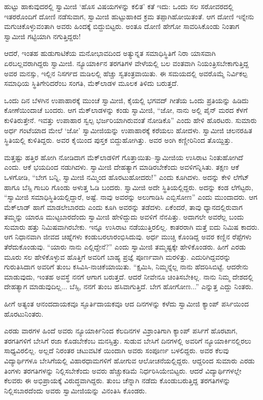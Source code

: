 ಹುಟ್ಟು ಹಾಕುವುದರಲ್ಲಿ ಸ್ವಾಮೀಜಿ ‘ಹೊಸ ವಿಷಯಗಳನ್ನು ಕಲಿತ’ ಕತೆ ಇದು: ಒಂದು ಸಲ ಸರೋವರದಲ್ಲಿ ಇತರರೊಂದಿಗೆ ದೋಣಿ ನಡೆಸುವಾಗ, ಸ್ವಾಮೀಜಿ ಹುಟ್ಟುಹಾಕಿದ ಕ್ರಮ ತಪ್ಪಾಗಿಹೋಯಿತಂತೆ. ಆಗ ದೋಣಿ ಇನ್ನೇನು ಮಗುಚಿಕೊಳ್ಳುವಂತಾಗಿ ಅವರು ಹಿಂದಕ್ಕೆ ಬಿದ್ದುಬಿಟ್ಟರು. ಅಂತೂ ದೋಣಿ ಹೇಗೋ ಸಾವರಿಸಿಕೊಂಡು ನಿಂತಾಗ ಸ್ವಾಮೀಜಿ ಗಟ್ಟಿಯಾಗಿ ನಗುತ್ತಿದ್ದರು!

ಆದರೆ, ಇಂತಹ ಹುಡುಗಾಟಿಕೆಯ ಮನೋಭಾವದಿಂದ ಅತ್ಯುನ್ನತ ಸಮಾಧಿಸ್ಥಿತಿಗೆ ನಿರಾ ಯಾಸವಾಗಿ ಏರಬಲ್ಲವರಾಗಿದ್ದರು ಸ್ವಾಮೀಜಿ. ನ್ಯೂಯಾರ್ಕಿನ ತರಗತಿಗಳ ವೇಳೆಯಲ್ಲಿ ಬಲ ವಂತವಾಗಿ ನಿಯಂತ್ರಿಸಬೇಕಾಗುತ್ತಿದ್ದ ಅವರ ಮನಸ್ಸು, ಇಲ್ಲಿನ ನಿಸರ್ಗದ ಮಡಿಲಲ್ಲಿ ಹೆಚ್ಚು ಸ್ವತಂತ್ರವಾಯಿತು. ಈ ಸಮಯದಲ್ಲಿ ಅವರೊಮ್ಮೆ ನಿರ್ವಿಕಲ್ಪ ಸಮಾಧಿಯ ಸ್ಥಿತಿಗೇರಿದರೆಂಬ ಸಂಗತಿ, ಮೆಕ್​ಲಾಡಳ ಮೂಲಕ ತಿಳಿದು ಬರುತ್ತದೆ.

ಒಂದು ದಿನ ಬೆಳಗಿನ ಉಪಾಹಾರಕ್ಕೆ ಮುಂಚೆ ಸ್ವಾಮೀಜಿ, ಕೈಯಲ್ಲಿ ಭಗವದ್ ಗೀತೆಯ ಒಂದು ಪ್ರತಿಯನ್ನು ಹಿಡಿದು ಕೋಣೆಯಿಂದಾಚೆ ಬಂದರು. ಆಗ ಮೆಕ್​ಲಾಡಳನ್ನು ಕಂಡು ಸ್ವಾಮೀಜಿ, “ಜೋ, ನಾನು ಅಲ್ಲಿ ಪೈನ್ ಮರದ ಕೆಳಗೆ ಕುಳಿತಿರುತ್ತೇನೆ. ಇವತ್ತು ಉಪಾಹಾರ ಸ್ವಲ್ಪ ಭರ್ಜರಿಯಾಗಿರುವಂತೆ ನೋಡಿಕೊ” ಎಂದು ಹೇಳಿ ಹೊರಟರು. ಸುಮಾರು ಅರ್ಧ ಗಂಟೆಯಾದ ಮೇಲೆ ‘ಜೋ’ ಸ್ವಾಮೀಜಿಯನ್ನು ಉಪಾಹಾರಕ್ಕೆ ಕರೆಯಲು ಹೋದಳು. ಸ್ವಾಮೀಜಿ ಚಲನರಹಿತ ಸ್ಥಿತಿಯಲ್ಲಿ ಕುಳಿತಿದ್ದರು. ಅವರ ಕೈಯಿಂದ ಪುಸ್ತಕ ಬಿದ್ದುಹೋಗಿತ್ತು. ಅವರ ಅಂಗಿ ಕಣ್ಣೀರಿನಿಂದ ತೊಯ್ದಿತ್ತು.

ಮತ್ತಷ್ಟು ಹತ್ತಿರ ಹೋಗಿ ನೋಡಿದಾಗ ಮೆಕ್​ಲಾಡಳಿಗೆ ಗೊತ್ತಾಯಿತು–ಸ್ವಾಮೀಜಿಯ ಉಸಿರಾಟ ನಿಂತುಹೋಗಿದೆ ಎಂದು. ಆಕೆ ಭಯದಿಂದ ನಡುಗಿದಳು. ಸ್ವಾಮೀಜಿ ದೇಹತ್ಯಾಗ ಮಾಡಿರಬೇಕೆಂದು ಅವಳಿಗನ್ನಿಸಿತು. ತಕ್ಷಣ ಆಕೆ ಒಳಗೋಡಿ, “ಬೇಗ ಬನ್ನಿ, ಸ್ವಾಮೀಜಿ ನಮ್ಮಿಂದ ಹೊರಟುಹೋದರು!” ಎಂದು ಕೂಗಿದಳು. ಅದನ್ನು ಕೇಳಿ ಲೆಗೆಟ್ ಹಾಗೂ ಬೆಸ್ಸಿ ಗಾಬರಿ ಗೊಂಡು ಅಳುತ್ತ ಓಡಿ ಬಂದರು. ಸ್ವಾಮೀಜಿ ಅದೇ ಸ್ಥಿತಿಯಲ್ಲಿದ್ದರು. ಅದನ್ನು ಕಂಡ ಲೆಗೆಟ್ಟರು, “ಸ್ವಾಮೀಜಿ ಸಮಾಧಿಸ್ಥಿತಿಯಲ್ಲಿದ್ದಾರೆ, ಅಷ್ಟೆ. ನಾವು ಅವರನ್ನು ಅಲುಗಾಡಿಸಿ ಎಬ್ಬಿಸೋಣ” ಎಂದು ಮುಂದಾದರು. ಆಗ ಮೆಕ್​ಲಾಡ್ ಹಾಗೆ ಮಾಡಲೇಬಾರದು ಎಂದು ಕೂಗಿ ಅವರನ್ನು ತಡೆದಳು. ಏಕೆಂದರೆ, ತಾವು ಧ್ಯಾನದಲ್ಲಿರುವಾಗ ತಮ್ಮನ್ನು ಯಾರೂ ಮುಟ್ಟಬಾರದೆಂದು ಸ್ವಾಮೀಜಿ ಹೇಳಿದ್ದುದು ಅವಳಿಗೆ ನೆನಪಿತ್ತು. ಅದಾಗಲೇ ಅವರೆಲ್ಲ ಬಂದು ಸುಮಾರು ಹತ್ತು ನಿಮಿಷವಾಗಿರಬೇಕು. ಇನ್ನೂ ಉಸಿರಾಟ ನಡೆಯುತ್ತಿರಲಿಲ್ಲ. ಕಾತರರಾಗಿ ಮತ್ತೆ ಐದು ನಿಮಿಷ ಕಾದರು. ಆಗ ನಿಧಾನವಾಗಿ ಜೀವದ ಚಿಹ್ನೆಗಳು ಕಂಡುಬರಲಾರಂಭಿಸಿದುವು. ಅರ್ಧ ಮುಚ್ಚಿ ಕೊಂಡಿದ್ದ ಅವರ ಕಣ್ಣಿನ ರೆಪ್ಪೆಗಳು ತೆರೆದುಕೊಂಡುವು. “ಯಾರು ನಾನು ಎಲ್ಲಿದ್ದೇನೆ?” ಎಂದು ಸ್ವಾಮೀಜಿ ತಮ್ಮಷ್ಟಕ್ಕೇ ಹೇಳಿಕೊಂಡರು. ಹೀಗೆ ಎರಡು ಮೂರು ಸಲ ಹೇಳಿಕೊಳ್ಳುವ ಹೊತ್ತಿಗೆ ಅವರಿಗೆ ಬಾಹ್ಯ ಪ್ರಜ್ಞೆ ಪೂರ್ಣವಾಗಿ ಮರಳಿತ್ತು. ಎದುರಿಗಿದ್ದವರನ್ನು ಗುರುತಿಸಿದಾಗ ಅವರಿಗೆ ತುಂಬ ಕಸಿವಿಸಿ-ನಾಚಿಕೆಯಾಯಿತು. “ಕ್ಷಮಿಸಿ, ನಿಮ್ಮನ್ನೆಲ್ಲ ನಾನು ಹೆದರಿಸಿಬಿಟ್ಟೆ. ಆದರೇನು ಮಾಡುವುದು, ಇಂತಹ ಅವಸ್ಥೆ ನನಗೆ ಆಗಾಗ ಬರುತ್ತದೆ. ಆದರೆ ನೀವೇನೂ ಚಿಂತಿಸಬೇಕಿಲ್ಲ. ನಾನು ನಿಮ್ಮ ದೇಶದಲ್ಲಿ ದೇಹತ್ಯಾಗ ಮಾಡುವುದಿಲ್ಲ... ಬೆಸ್ಸಿ, ನನಗೆ ತುಂಬ ಹಸಿವಾಗುತ್ತಿದೆ. ಬೇಗ ಹೋಗೋಣ...” ಎನ್ನುತ್ತ ಎದ್ದು ನಿಂತರು.

ಹೀಗೆ ಅತ್ಯಂತ ಆನಂದದಾಯಕವೂ ಸ್ಫೂರ್ತಿದಾಯಕವೂ ಆದ ದಿನಗಳನ್ನು ಕಳೆದು ಸ್ವಾಮೀಜಿ ಕ್ಯಾಂಪ್ ಪರ್ಸಿಯಿಂದ ಹೊರಟುನಿಂತರು.

ಎರಡು ವಾರಗಳ ಹಿಂದೆ ಅವರು ನ್ಯೂಯಾರ್ಕಿನಿಂದ ಕೆಲದಿನಗಳ ವಿಶ್ರಾಂತಿಗಾಗಿ ಕ್ಯಾಂಪ್ ಪರ್ಸಿಗೆ ಹೊರಟಾಗ, ತರಗತಿಗಳಿಗೆ ಬೇಸಿಗೆ ರಜಾ ಕೊಡಬೇಕೆಂಬ ಮನಸ್ಸಿತ್ತು. ಸುಡುವ ಬೇಸಿಗೆ ದಿನಗಳಲ್ಲಿ ಅವರಿಗೆ ನ್ಯೂಯಾರ್ಕಿನಲ್ಲಿರಲು ಸಾಧ್ಯವಿರಲಿಲ್ಲ. ಅಲ್ಲದೆ ನಿರಂತರ ಚಟುವಟಿಕೆ ಯಿಂದಾಗಿ ಅವರು ಸಂಪೂರ್ಣ ಬಳಲಿದ್ದರು. ಅವರ ಕೆಲವು ವಿದ್ಯಾರ್ಥಿಗಳೂ ಬೇಸಿಗೆಯಲ್ಲಿ ವಿಹಾರಧಾಮಗಳಿಗೆ ಹೋಗುವ ಆಲೋಚನೆಯಲ್ಲಿದ್ದರು. ಆದ್ದರಿಂದ ಸುಮಾರು ಎರಡು ತಿಂಗಳು ತರಗತಿಗಳನ್ನು ನಿಲ್ಲಿಸಬೇಕೆಂದು ಅವರು ಹೆಚ್ಚುಕಡಿಮೆ ನಿರ್ಧರಿಸಿಯೇಬಿಟ್ಟರು. ಆದರೆ ವಿದ್ಯಾರ್ಥಿಗಳಲ್ಲೇ ಕೆಲವರು ಈ ಅಭಿಪ್ರಾಯಕ್ಕೆ ವಿರುದ್ಧವಾಗಿದ್ದರು. ತುಂಬ ಚೆನ್ನಾಗಿ ನಡೆದು ಕೊಂಡುಬರುತ್ತಿದ್ದ ತರಗತಿಗಳನ್ನು ನಿಲ್ಲಿಸಬಾರದೆಂದು ಅವರು ಸ್ವಾಮೀಜಿಯನ್ನು ವಿನಂತಿಸಿ ಕೊಂಡರು.

